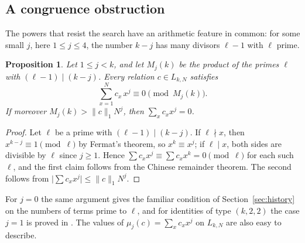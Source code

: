 \documentclass[11pt]{amsart}
\newtheorem{proposition}{Proposition}[section]
\theoremstyle{definition}
\theoremstyle{remark}
\begin{document}
\begin{table}[htbp]
\centering\scriptsize
\setlength{\tabcolsep}{3pt}

\caption{Improvements by power for $33\le k\le100$ ($m\le16$), by all the methods of
Section~\ref{sec:high}: entries improved that were attained by an identity and that were
derived bounds, terms saved, and the largest saving in one entry.}\label{tab:perkhigh}
\end{table}

\begin{table}[htbp]
\centering\small

\caption{Contribution of each method to the improvements for $33\le k\le100$ ($m\le16$).
``Sieve search'': the searches of Section~\ref{sec:highsearch} with all values of $N$ and all
repetitions. ``Improves'': entries improved by the method; ``only this'': entries improved by it
and by no other method; ``cumulative'' and ``terms saved'': entries improved, and terms saved by
the best identity found, when the methods are added in the order listed.}\label{tab:contrib}
\end{table}

\subsection{A congruence obstruction}\label{sec:congruence}
The powers that resist the search have an arithmetic feature in common: for some small $j$,
here $1\le j\le4$, the number $k-j$ has many divisors $\ell-1$ with $\ell$ prime.

\begin{proposition}\label{prop:moment}
Let $1\le j<k$, and let $M_j(k)$ be the product of the primes $\ell$ with $(\ell-1)\mid(k-j)$. Every
relation $c\in L_{k,N}$ satisfies
\[
\sum_{x=1}^{N} c_x\,x^j\equiv 0 \pmod{M_j(k)}.
\]
If moreover $M_j(k)>\|c\|_1N^j$, then $\sum_x c_x x^j=0$.
\end{proposition}

\begin{proof}
Let $\ell$ be a prime with $(\ell-1)\mid(k-j)$. If $\ell\nmid x$, then $x^{k-j}\equiv1\pmod\ell$
by Fermat's theorem, so $x^k\equiv x^j$; if $\ell\mid x$, both sides are divisible by $\ell$
since $j\ge1$. Hence $\sum c_x x^j\equiv\sum c_x x^k=0\pmod\ell$ for each such $\ell$, and the
first claim follows from the Chinese remainder theorem. The second follows from
$\bigl|\sum c_x x^j\bigr|\le\|c\|_1N^j$.
\end{proof}

For $j=0$ the same argument gives the familiar condition of Section~\ref{sec:history} on the
numbers of terms prime to $\ell$, and for identities of type $(k,2,2)$ the case $j=1$ is proved in
\cite{Asiryan2025}. The values of $\mu_j(c)=\sum_xc_xx^j$ on $L_{k,N}$ are also easy
to describe.
\end{document}
